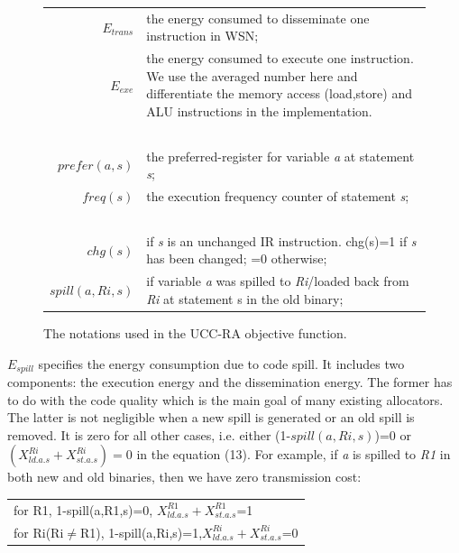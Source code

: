 \begin{figure}[htbp]
\begin{normalsize}
\begin{center}
\begin{tabular}{r|p{5in}} 
$E_{trans}$ & the energy consumed to disseminate one instruction in WSN; \\
$E_{exe}$ & the energy consumed to execute one instruction.
We use the averaged number here and differentiate the memory access 
(load,store) and ALU instructions in the implementation. \\
~ & \\
$prefer(a, s)$ & the preferred-register for variable {\it a} at statement {\it s}; \\
$freq(s)$ & the execution frequency counter of statement {\it s}; \\
~ & \\
$chg(s)$ & if {\it s} is an unchanged IR instruction.
chg(s)=1 if {\it s} has been changed; =0 otherwise;\\
$spill(a, Ri, s)$ & if variable {\it a} was spilled to {\it Ri}/loaded back from {\it Ri} 
at statement s in the old binary; 
\end{tabular}
\caption{The notations used in the UCC-RA objective function.}
\label{notation.obj}
\end{center}
\end{normalsize}
\end{figure}



$E_{spill}$ specifies the energy consumption due to code spill. It
includes two components: the execution energy and the dissemination
energy. The former has to do with the code quality which is the main
goal of many existing allocators. The latter is not negligible when a
new spill is generated or an old spill is removed. It is zero for all
other cases, i.e. either (1-$spill(a,Ri,s)$)=0 or
$(X_{ld.a.s}^{Ri}+X_{st.a.s}^{Ri})=0$ in the equation (13).  For
example, if {\it a} is spilled to {\it R1} in both new and old
binaries, then we have zero transmission cost:

\vspace{+0.1in}
\begin{tabular}{l}
for R1, 1-spill(a,R1,s)=0, $X_{ld.a.s}^{R1}+X_{st.a.s}^{R1}$=1\\ for
Ri(Ri$\neq$R1), 1-spill(a,Ri,s)=1,$X_{ld.a.s}^{Ri}+X_{st.a.s}^{Ri}$=0
\\
\end{tabular}
\vspace{+0.1in}

